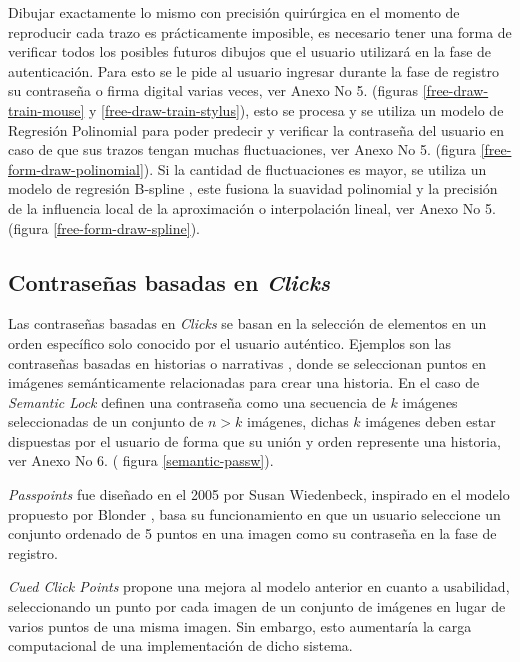 Dibujar exactamente lo mismo con precisión quirúrgica en el momento de reproducir cada trazo es prácticamente imposible, es necesario tener una forma de verificar todos los posibles futuros dibujos que el usuario utilizará en la fase de autenticación. 
Para esto se le pide al usuario ingresar durante la fase de registro su contraseña o firma digital varias veces, ver Anexo No 5. (figuras \ref{free-draw-train-mouse} y \ref{free-draw-train-stylus}), esto se procesa y se utiliza un modelo de Regresión Polinomial \cite{heiberger2009polynomial} para poder predecir y verificar la contraseña del usuario en caso de que sus trazos tengan muchas fluctuaciones, ver Anexo No 5. (figura \ref{free-form-draw-polinomial}).  Si la cantidad de fluctuaciones es mayor, se utiliza un modelo de regresión B-spline \cite{imoto2000b}, este fusiona la suavidad polinomial y la precisión de la influencia local de la aproximación o interpolación lineal, ver Anexo No 5. (figura \ref{free-form-draw-spline}).





\subsection{Contraseñas basadas en \textit{Clicks}}
Las contraseñas basadas en \textit{Clicks} se basan en la selección de elementos en un orden específico solo conocido por el usuario auténtico. 
Ejemplos son las contraseñas basadas en historias o narrativas \cite{olade2023story, hoover2015narrative}, donde se seleccionan puntos en imágenes semánticamente relacionadas para crear una historia. En el caso de  \textit{Semantic Lock} \cite{olade2023story} definen una contraseña como una secuencia de $k$ imágenes seleccionadas de un conjunto de $n > k$ imágenes, dichas $k$ imágenes deben estar dispuestas por el usuario de forma que su unión y orden represente una historia, ver Anexo No 6. ( figura \ref{semantic-passw}).

\textit{Passpoints} \cite{wiedenbeck2005passpoints} fue diseñado en el 2005 por Susan Wiedenbeck, inspirado en el modelo propuesto por Blonder \cite{blonder1996graphical}, basa su funcionamiento en que un usuario seleccione un conjunto ordenado de 5 puntos en una imagen como su contraseña en la fase de registro.

\textit{Cued Click Points} \cite{chiasson2007graphical} propone una mejora al modelo anterior en cuanto a usabilidad, seleccionando un punto por cada imagen de un conjunto de imágenes en lugar de varios puntos de una misma imagen. Sin embargo, esto aumentaría la carga computacional de una implementación de dicho sistema.

